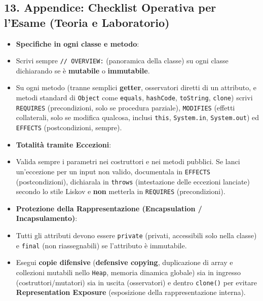 \subsection{13. Appendice: Checklist Operativa per l'Esame (Teoria e Laboratorio)}\label{13-appendice-checklist-operativa-per-l-esame-teoria-e-laboratorio}

\begin{itemize}

\item \textbf{Specifiche in ogni classe e metodo}:

\item Scrivi sempre \texttt{// OVERVIEW:} (panoramica della classe) su ogni classe dichiarando se è \textbf{mutabile} o \textbf{immutabile}.



\item Su ogni metodo (tranne semplici \textbf{getter}, osservatori diretti di un attributo, e metodi standard di \texttt{Object} come \texttt{equals}, \texttt{hashCode}, \texttt{toString}, \texttt{clone}) scrivi \texttt{REQUIRES} (precondizioni, solo se procedura parziale), \texttt{MODIFIES} (effetti collaterali, solo se modifica qualcosa, inclusi \texttt{this}, \texttt{System.in}, \texttt{System.out}) ed \texttt{EFFECTS} (postcondizioni, sempre).



\item \textbf{Totalità tramite Eccezioni}:

\item Valida sempre i parametri nei costruttori e nei metodi pubblici. Se lanci un'eccezione per un input non valido, documentala in \texttt{EFFECTS} (postcondizioni), dichiarala in \texttt{throws} (intestazione delle eccezioni lanciate) secondo lo stile Liskov e \textbf{non} metterla in \texttt{REQUIRES} (precondizioni).



\item \textbf{Protezione della Rappresentazione (Encapsulation / Incapsulamento)}:

\item Tutti gli attributi devono essere \texttt{private} (privati, accessibili solo nella classe) e \texttt{final} (non riassegnabili) se l'attributo è immutabile.



\item Esegui \textbf{copie difensive} (\textbf{defensive copying}, duplicazione di array e collezioni mutabili nello \texttt{Heap}, memoria dinamica globale) sia in ingresso (costruttori/mutatori) sia in uscita (osservatori) e dentro \texttt{clone()} per evitare \textbf{Representation Exposure} (esposizione della rappresentazione interna).




\end{itemize}
